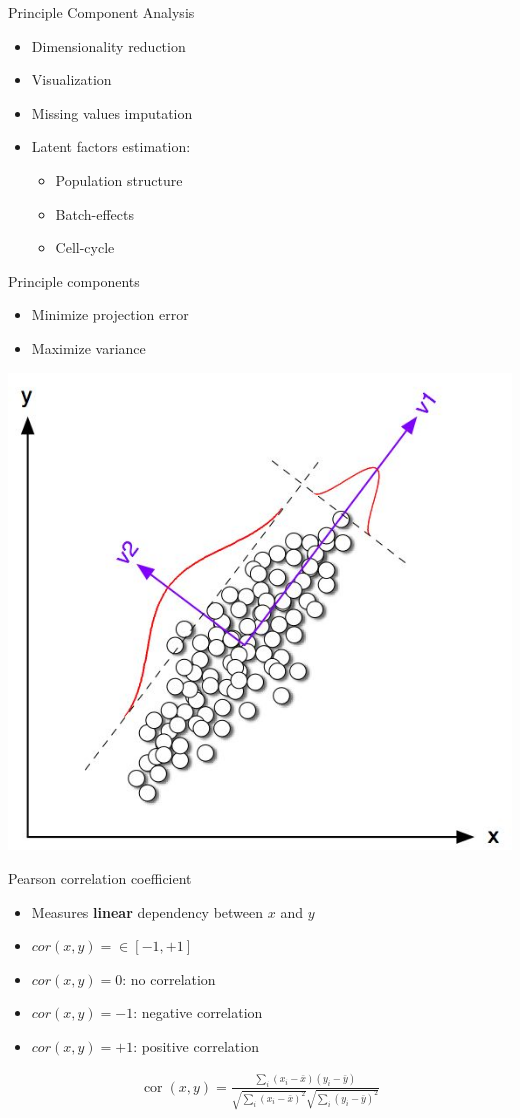 \documentclass{beamer}\usepackage[]{graphicx}\usepackage[]{color}
\begin{document}
\begin{frame}{Principle Component Analysis}
  \begin{itemize}
    \item Dimensionality reduction
    \item Visualization
    \item Missing values imputation
    \item Latent factors estimation:
      \begin{itemize}
        \item Population structure
        \item Batch-effects
        \item Cell-cycle
      \end{itemize}
  \end{itemize}
\end{frame}

\begin{frame}{Principle components}
  \begin{itemize}
    \item Minimize projection error
    \item Maximize variance
  \end{itemize}
  \begin{center}
    \includegraphics[width=.6\linewidth]{pca.jpg}
  \end{center}
\end{frame}

\begin{frame}{Pearson correlation coefficient}
  \begin{itemize}
    \item Measures \textbf{linear} dependency between $x$ and $y$
    \item $cor(x,y) = \in \left[-1,+1\right]$
    \item $cor(x,y) = 0$: no correlation
    \item $cor(x,y) = -1$: negative correlation
    \item $cor(x,y) = +1$: positive correlation
  \end{itemize}
  \begin{definition}
    \begin{align*}
      \operatorname{cor}(x, y) = \frac{\sum_i (x_i - \bar{x})(y_i - \bar{y})}
      {\sqrt{\sum_i (x_i - \bar{x})^2}\sqrt{\sum_i (y_i - \bar{y})^2}}
    \end{align*}
  \end{definition}
\end{frame}
\end{document}
